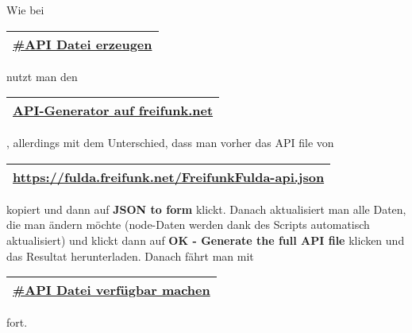 Wie bei%
\begin{tabular}{c}
\arrayrulecolor{FFmagenta} \hline
\href{https://wiki.mag.lab.sh/wiki/Freifunk_Fulda/Freifunk_API#API_Datei_erzeugen}{#API Datei erzeugen} \\
\hline
\end{tabular}
%
 nutzt man den%
\begin{tabular}{c}
\arrayrulecolor{FFmagenta} \hline
\href{http://freifunk.net/api-generator/}{API-Generator auf freifunk.net} \\
\hline
\end{tabular}
%
, allerdings mit dem Unterschied, dass man vorher das API file von%
\begin{tabular}{c}
\arrayrulecolor{FFmagenta} \hline
\href{https://fulda.freifunk.net/FreifunkFulda-api.json}{https://fulda.freifunk.net/FreifunkFulda-api.json} \\
\hline
\end{tabular}
%
kopiert und dann auf \textbf{JSON to form} klickt. Danach aktualisiert man alle Daten, die man ändern möchte (node-Daten werden dank des Scripts automatisch aktualisiert) und klickt dann auf \textbf{OK - Generate the full API file} klicken und das Resultat herunterladen. Danach fährt man mit%
\begin{tabular}{c}
\arrayrulecolor{FFmagenta} \hline
\href{https://wiki.mag.lab.sh/wiki/Freifunk_Fulda/Freifunk_API#API_Datei_verf.C3.BCgbar_machen}{#API Datei verfügbar machen} \\
\hline
\end{tabular}
%
fort.

